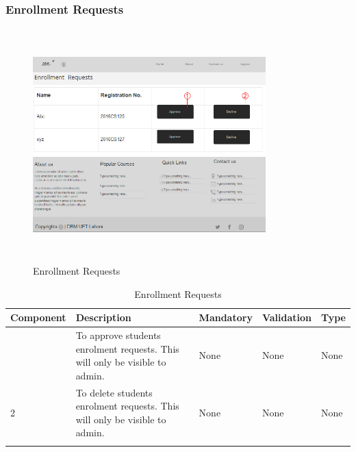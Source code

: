 \documentclass[12pt]{article}
\begin{document}
\subsubsection{Enrollment Requests}
\begin{figure}[h]
  \centering
  \includegraphics[width=9cm, height=9cm]{EnrollmentRequests}
  \caption{Enrollment Requests}
\end{figure}

\newpage
\begin{longtable}{|>{\raggedright\arraybackslash}p{2.5cm}|>{\raggedright\arraybackslash}p{4cm}|>{\raggedright\arraybackslash}p{2.2cm}|>{\raggedright\arraybackslash}p{2cm}|>{\raggedright\arraybackslash}p{2cm}|}
\hline
\textbf{Component} & \textbf{Description} & \textbf{Mandatory} & \textbf{Validation} & \textbf{Type}\\
\hline
1 &
To approve students enrolment requests. This will only be visible to admin. &
None &
None &
None\\
\hline

2 &
To delete students enrolment requests. This will only be visible to admin. &
None &
None &
None \\
\hline

\caption{Enrollment Requests}
\end{longtable}
\end{document}
